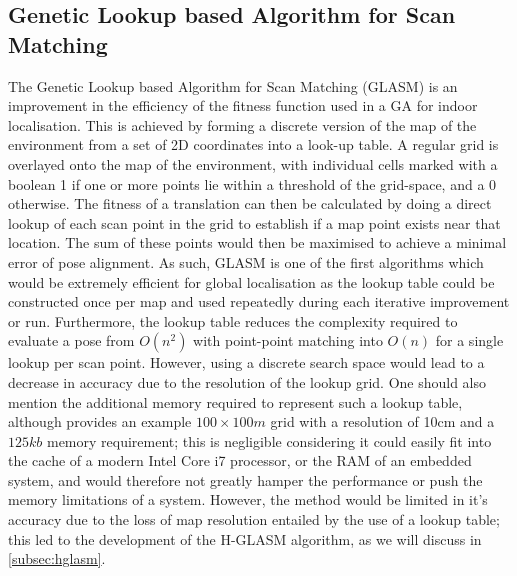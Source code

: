 \documentclass[authoryearcitations]{UoYCSproject}
\begin{document}
\subsection{Genetic Lookup based Algorithm for Scan Matching}
The Genetic Lookup based Algorithm for Scan Matching (GLASM) \cite{Lenac2007-xm} is an improvement in the efficiency of the fitness function used in a GA for indoor localisation. This is achieved by forming a discrete version of the map of the environment from a set of 2D coordinates into a look-up table. A regular grid is overlayed onto the map of the environment, with individual cells marked with a boolean 1 if one or more points lie within a threshold of the grid-space, and a 0 otherwise. The fitness of a translation can then be calculated by doing a direct lookup of each scan point in the grid to establish if a map point exists near that location. The sum of these points would then be maximised to achieve a minimal error of pose alignment. As such, GLASM is one of the first algorithms which would be extremely efficient for global localisation as the lookup table could be constructed once per map and used repeatedly during each iterative improvement or run. Furthermore, the lookup table reduces the complexity required to evaluate a pose from $O(n^2)$ with point-point matching into $O(n)$ for a single lookup per scan point. However, using a discrete search space would lead to a decrease in accuracy due to the resolution of the lookup grid. One should also mention the additional memory required to represent such a lookup table, although \citeauthor{Lenac2007-xm} provides an example $100\times100m$ grid with a resolution of 10cm and a $125kb$ memory requirement; this is negligible considering it could easily fit into the cache of a modern Intel Core i7 processor, or the RAM of an embedded system, and would therefore not greatly hamper the performance or push the memory limitations of a system. However, the method would be limited in it's accuracy due to the loss of map resolution entailed by the use of a lookup table; this led to the development of the H-GLASM algorithm, as we will discuss in \autoref{subsec:hglasm}. 
\end{document}
